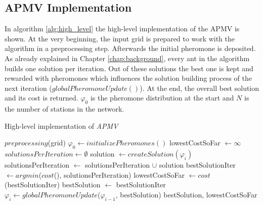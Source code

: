 \subsection{APMV Implementation}
In algorithm \ref{alg:high_level} the high-level implementation of the APMV is shown. At the very beginning, the input grid is prepared to work with the algorithm in a preprocessing step. Afterwards the initial pheromone is deposited. As already explained in Chapter \ref{chap:background}, every ant in the algorithm builds one solution per iteration. Out of these solutions the best one is kept and rewarded with pheromones which influences the solution building process of the next iteration ($globalPheromoneUpdate()$). At the end, the overall best solution and its cost is returned. $\varphi_0$ is the pheromone distribution at the start and $N$ is the number of stations in the network.

\begin{algorithm}[h]
	\caption{High-level implementation of \textit{APMV}}
	\label{alg:high_level}
	\begin{algorithmic}[1]
		\State $preprocessing$(grid) 
		\State $\varphi_0 \gets initializePheromones()$ 
		\State lowestCostSoFar $\gets \infty$ 
		\State $solutionsPerIteration \gets \emptyset$
		\State solution $\gets createSolution(\varphi_i)$
		\State solutionsPerIteration $\gets$ solutionsPerIteration $\cup$ solution
		\EndFor
		\State bestSolutionIter $\gets argmin$($cost$(), solutionsPerIteration)
		\State lowestCostSoFar $\gets cost$(bestSolutionIter)
		\State bestSolution $\gets$ bestSolutionIter
		\EndIf
		\State $\varphi_i \gets globalPheromoneUpdate$($\varphi_{i-1}$, bestSolution)
		\EndFor
		\State \Return bestSolution, lowestCostSoFar
	\end{algorithmic}
\end{algorithm}


